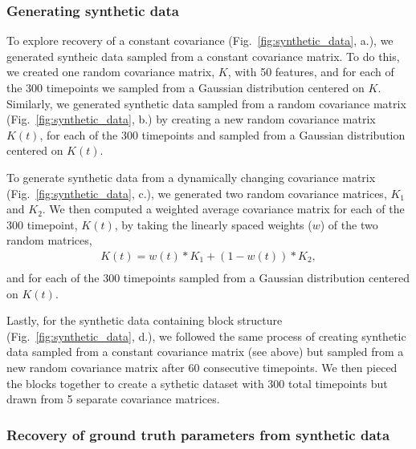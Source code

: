 \subsubsection*{Generating synthetic data}
To explore recovery of a constant covariance (Fig.~\ref{fig:synthetic_data},  a.), we generated syntheic
data sampled from a constant covariance matrix. To do this, we created one random
covariance matrix, $K$, with 50 features, and for each of the 300 timepoints  we
sampled from a Gaussian distribution centered on $K$.  Similarly, we generated synthetic data
sampled from a random covariance matrix (Fig.~\ref{fig:synthetic_data}, b.) by creating a new random
covariance matrix $K(t)$, for each of the 300 timepoints and sampled from a
Gaussian distribution centered on $K(t)$.

To generate synthetic data from a dynamically changing covariance
matrix (Fig.~\ref{fig:synthetic_data},  c.),
we generated two random covariance
matrices, $K_{1}$ and $K_{2}$.  We then computed a weighted average covariance matrix
for each of the 300 timepoint, $K(t)$, 
by taking the linearly spaced weights ($w$) of the two random matrices, 
\begin{align}
K(t) = w(t) * K_{1} + (1 - w(t)) *  K_{2}, \\\label{eqn:ramping}
\end{align}
and for each of the 300 timepoints sampled from a
Gaussian distribution centered on $K(t)$.

Lastly, for the synthetic data containing block structure (Fig.~\ref{fig:synthetic_data},  d.), we followed the same
process of creating synthetic data sampled from a constant covariance
matrix (see above) but sampled from a new random covariance matrix
after 60 consecutive timepoints.  We then pieced the blocks together
to create a sythetic dataset with 300 total timepoints but drawn from
5 separate covariance matrices. 

\subsubsection*{Recovery of ground truth parameters from synthetic
  data}



